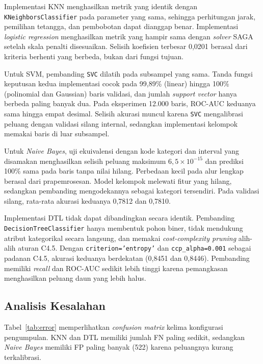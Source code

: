 Implementasi KNN menghasilkan metrik yang identik dengan \texttt{KNeighborsClassifier} pada parameter yang sama, sehingga perhitungan jarak, pemilihan tetangga, dan pembobotan dapat dianggap benar. Implementasi \textit{logistic regression} menghasilkan metrik yang hampir sama dengan \textit{solver} SAGA setelah skala penalti disesuaikan. Selisih koefisien terbesar 0,0201 berasal dari kriteria berhenti yang berbeda, bukan dari fungsi tujuan.

Untuk SVM, pembanding \texttt{SVC} dilatih pada subsampel yang sama. Tanda fungsi keputusan kedua implementasi cocok pada 99,89\% (linear) hingga 100\% (polinomial dan Gaussian) baris validasi, dan jumlah \textit{support vector} hanya berbeda paling banyak dua. Pada eksperimen 12.000 baris, ROC-AUC keduanya sama hingga empat desimal. Selisih akurasi muncul karena \texttt{SVC} mengalibrasi peluang dengan validasi silang internal, sedangkan implementasi kelompok memakai baris di luar subsampel.

Untuk \textit{Naive Bayes}, uji ekuivalensi dengan kode kategori dan interval yang disamakan menghasilkan selisih peluang maksimum $6{,}5\times10^{-15}$ dan prediksi 100\% sama pada baris tanpa nilai hilang. Perbedaan kecil pada alur lengkap berasal dari prapemrosesan. Model kelompok melewati fitur yang hilang, sedangkan pembanding mengodekannya sebagai kategori tersendiri. Pada validasi silang, rata-rata akurasi keduanya 0,7812 dan 0,7810.

Implementasi DTL tidak dapat dibandingkan secara identik. Pembanding \texttt{DecisionTreeClassifier} hanya membentuk pohon biner, tidak mendukung atribut kategorikal secara langsung, dan memakai \textit{cost-complexity pruning} alih-alih aturan C4.5. Dengan \texttt{criterion='entropy'} dan \texttt{ccp\_alpha=0.001} sebagai padanan C4.5, akurasi keduanya berdekatan (0,8451 dan 0,8446). Pembanding memiliki \textit{recall} dan ROC-AUC sedikit lebih tinggi karena pemangkasan menghasilkan peluang daun yang lebih halus.

\subsection{Analisis Kesalahan}
Tabel~\ref{tab:error} memperlihatkan \textit{confusion matrix} kelima konfigurasi pengumpulan. KNN dan DTL memiliki jumlah FN paling sedikit, sedangkan \textit{Naive Bayes} memiliki FP paling banyak (522) karena peluangnya kurang terkalibrasi.

